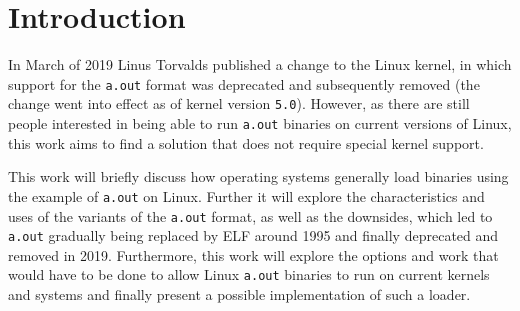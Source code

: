 \documentclass[draft,final]{vutinfth} %
\begin{document}
\frontmatter %

\addstatementpage

\begin{danksagung*}
\end{danksagung*}

\begin{acknowledgements*}
\end{acknowledgements*}

\begin{kurzfassung}
\end{kurzfassung}

\begin{abstract}
\end{abstract}


\tableofcontents %

\mainmatter

\chapter{Introduction}
\label{intro}

In March of 2019 Linus Torvalds published a change \cite{PhoronixNews} \cite{LinuxKernelGitMsg} to the Linux kernel, in which support for the \texttt{a.out} format was deprecated and subsequently removed (the change went into effect as of kernel version \texttt{5.0}). However, as there are still people interested in being able to run \texttt{a.out} binaries on current versions of Linux, this work aims to find a solution that does not require special kernel support.

This work will briefly discuss how operating systems generally load binaries using the example of \texttt{a.out} on Linux. Further it will explore the characteristics and uses of the variants of the \texttt{a.out} format, as well as the downsides, which led to \texttt{a.out} gradually being replaced by ELF around 1995 and finally deprecated and removed in 2019. Furthermore, this work will explore the options and work that would have to be done to allow Linux \texttt{a.out} binaries to run on current kernels and systems and finally present a possible implementation of such a loader.
\end{document}
